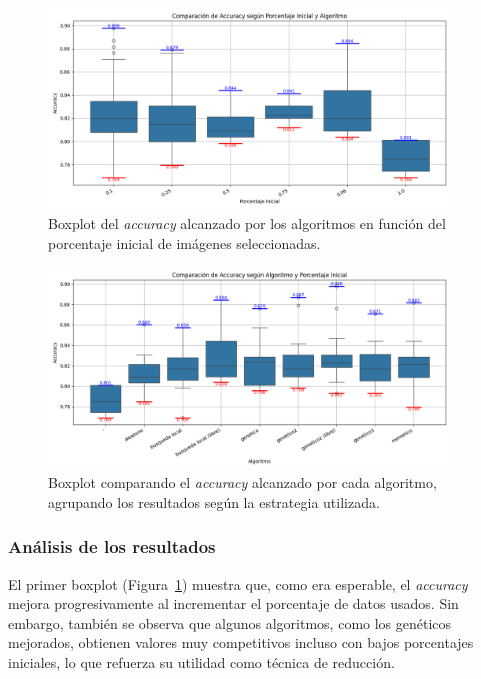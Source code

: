 \begin{figure}[!h]
    \centering
    \includegraphics[width=0.95\textwidth]{imagenes/mobilenet-BOXPLOT-accuracy-porcentaje}
    \caption{Boxplot del \textit{accuracy} alcanzado por los algoritmos en función del porcentaje inicial de imágenes seleccionadas.}
    \label{fig:boxplot-accuracy-porcentaje}
\end{figure}

\begin{figure}[!h]
    \centering
    \includegraphics[width=0.95\textwidth]{imagenes/mobilenet-BOXPLOT-accuracy-algoritmo}
    \caption{Boxplot comparando el \textit{accuracy} alcanzado por cada algoritmo, agrupando los resultados según la estrategia utilizada.}
    \label{fig:boxplot-accuracy-algoritmo}
\end{figure}

\subsubsection{Análisis de los resultados}\label{sec:analisis-de-los-resultados}

El primer boxplot (Figura~\ref{fig:boxplot-accuracy-porcentaje}) muestra que, como era esperable,
el \textit{accuracy} mejora progresivamente al incrementar el porcentaje de datos usados.
Sin embargo, también se observa que algunos algoritmos, como los genéticos mejorados, obtienen valores muy competitivos
incluso con bajos porcentajes iniciales, lo que refuerza su utilidad como técnica de reducción.


